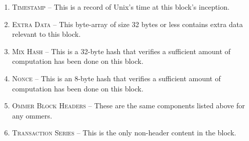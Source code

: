 \documentclass[10pt,a4paper,oneside]{scrartcl}
\begin{document}
\begin{enumerate}
	\item \textsc{Timestamp} -- This is a record of Unix's time at this block's inception.
	\item \textsc{Extra Data} -- This byte-array of size 32 bytes or less contains extra data relevant to this block.
	\item \textsc{Mix Hash} -- This is a 32-byte hash that verifies a sufficient amount of computation has been done on this block.
	\item \textsc{Nonce} -- This is an 8-byte hash that verifies a sufficient amount of computation has been done on this block.
	\item \textsc{Ommer Block Headers} -- These are the same components listed above for any ommers.
	\item \textsc{Transaction Series} -- This is the only non-header content in the block.
\end{enumerate}
\end{document}
